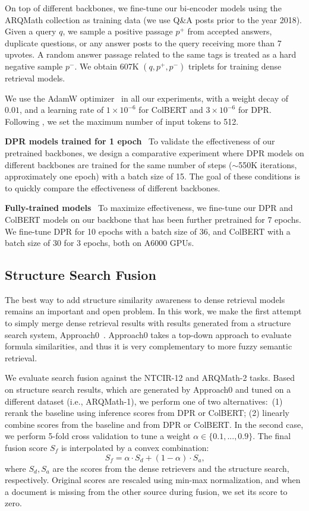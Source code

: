 \documentclass[11pt]{article}
\begin{document}
On top of different backbones, we fine-tune our bi-encoder models using the ARQMath collection as training data (we use Q\&A posts prior to the year 2018).
Given a query $q$, we sample a positive passage $p^+$ from accepted answers, duplicate questions, or any answer posts to the query receiving more than 7 upvotes.
A random answer passage related to the same tags is treated as a hard negative sample $p^-$.
We obtain 607K $(q,p^+,p^-)$ triplets for training dense retrieval models.

We use the AdamW optimizer~\cite{loshchilov2017adamW} in all our experiments, with a weight decay of $0.01$, and a learning rate of $1 \times 10^{-6}$ for ColBERT and $3 \times 10^{-6}$ for DPR.
Following \citet{reusch2021tu_dbs}, we set the maximum number of input tokens to 512.

\smallskip \noindent
\textbf{DPR models trained for 1 epoch} \  To validate the effectiveness of our pretrained backbones, we design a comparative experiment where DPR models on different backbones are trained for the same number of steps ($\sim$550K iterations, approximately one epoch) with a batch size of 15.
The goal of these conditions is to quickly compare the effectiveness of different backbones.

\smallskip \noindent
\textbf{Fully-trained models} \ To maximize effectiveness, we fine-tune our DPR and ColBERT models on our backbone that has been further pretrained for 7 epochs.
We fine-tune DPR for 10 epochs with a batch size of 36, and ColBERT with a batch size of 30 for 3 epochs, both on A6000 GPUs.

\subsection{Structure Search Fusion}

The best way to add structure similarity awareness to dense retrieval models remains an important and open problem.
In this work, we make the first attempt to simply merge dense retrieval results with results generated from a structure search system, Approach0~\cite{zhong2019structural,zhong2020accelerating}.
Approach0 takes a top-down approach to evaluate formula similarities, and thus it is very complementary to more fuzzy semantic retrieval.


We evaluate search fusion against the NTCIR-12 and ARQMath-2 tasks.
Based on structure search results, which are generated by Approach0 and tuned on a different dataset (i.e., ARQMath-1), we perform one of two alternatives:\ (1) rerank the baseline using inference scores from DPR or ColBERT;
(2) linearly combine scores from the baseline and from DPR or ColBERT.
In the second case, we perform 5-fold cross validation to tune a weight $\alpha \in \{0.1, ..., 0.9\}$.
The final fusion score $S_f$ is interpolated by a convex combination:
$$
S_f = \alpha \cdot S_d + (1 - \alpha) \cdot S_a \text{,}
$$
\noindent where $S_d, S_a$ are the scores from the dense retrievers and the structure search, respectively.
Original scores are rescaled using min-max normalization, and when a document is missing from the other source during fusion, we set its score to zero.
\end{document}
